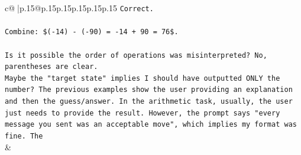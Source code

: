 \documentclass{article}
\begin{document}
{\begin{supertabular}{c@{$\;$}|p{.15\linewidth}@{}p{.15\linewidth}p{.15\linewidth}p{.15\linewidth}p{.15\linewidth}p{.15\linewidth}}
{{{\texttt{Correct.} \\
\\ 
\texttt{Combine: \$({-}14) {-} ({-}90) = {-}14 + 90 = 76\$.} \\
\\ 
\texttt{Is it possible the order of operations was misinterpreted? No, parentheses are clear.} \\
\texttt{Maybe the "target state" implies I should have outputted ONLY the number? The previous examples show the user providing an explanation and then the guess/answer. In the arithmetic task, usually, the user just needs to provide the result. However, the prompt says "every message you sent was an acceptable move", which implies my format was fine. The} \\
            }
        }
    }
    & \\ \\

\end{supertabular}
}
\end{document}
